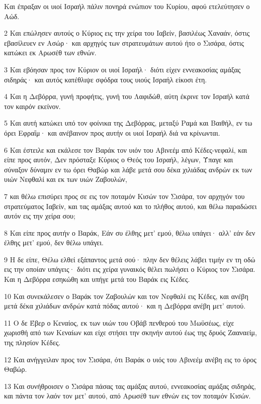\par Και έπραξαν οι υιοί Ισραήλ πάλιν πονηρά ενώπιον του Κυρίου, αφού ετελεύτησεν ο Αώδ.
\par 2 Και επώλησεν αυτούς ο Κύριος εις την χείρα του Ιαβείν, βασιλέως Χαναάν, όστις εβασίλευεν εν Ασώρ· και αρχηγός των στρατευμάτων αυτού ήτο ο Σισάρα, όστις κατώκει εκ Αρωσέθ των εθνών.
\par 3 Και εβόησαν προς τον Κύριον οι υιοί Ισραήλ· διότι είχεν εννεακοσίας αμάξας σιδηράς· και αυτός κατέθλιψε σφόδρα τους υιούς Ισραήλ είκοσι έτη.
\par 4 Και η Δεβόρρα, γυνή προφήτις, γυνή του Λαφιδώθ, αύτη έκρινε τον Ισραήλ κατά τον καιρόν εκείνον.
\par 5 Και αυτή κατώκει υπό τον φοίνικα της Δεβόρρας, μεταξύ Ραμά και Βαιθήλ, εν τω όρει Εφραΐμ· και ανέβαινον προς αυτήν οι υιοί Ισραήλ διά να κρίνωνται.
\par 6 Και έστειλε και εκάλεσε τον Βαράκ τον υιόν του Αβινεέμ από Κέδες-νεφαλί, και είπε προς αυτόν, Δεν πρόσταξε Κύριος ο Θεός του Ισραήλ, λέγων, Ύπαγε και σύναξον δύναμιν εν τω όρει Θαβώρ και λάβε μετά σου δέκα χιλιάδας ανδρών εκ των υιών Νεφθαλί και εκ των υιών Ζαβουλών,
\par 7 και θέλω επισύρει προς σε εις τον ποταμόν Κισών τον Σισάρα, τον αρχηγόν του στρατεύματος Ιαβείν, και τας αμάξας αυτού και το πλήθος αυτού, και θέλω παραδώσει αυτόν εις την χείρα σου;
\par 8 Και είπε προς αυτήν ο Βαράκ, Εάν συ έλθης μετ' εμού, θέλω υπάγει· αλλ' εάν δεν έλθης μετ' εμού, δεν θέλω υπάγει.
\par 9 Η δε είπε, Θέλω ελθεί εξάπαντος μετά σού· πλην δεν θέλεις λάβει τιμήν εν τη οδώ εις την οποίαν υπάγεις· διότι εις χείρα γυναικός θέλει πωλήσει ο Κύριος τον Σισάρα. Και η Δεβόρρα εσηκώθη και υπήγε μετά του Βαράκ εις Κέδες.
\par 10 Και συνεκάλεσεν ο Βαράκ τον Ζαβουλών και τον Νεφθαλί εις Κέδες, και ανέβη μετά δέκα χιλιάδων ανδρών κατά πόδας αυτού· και η Δεβόρρα ανέβη μετ' αυτού.
\par 11 Ο δε Έβερ ο Κεναίος, εκ των υιών του Οβάβ πενθερού του Μωϋσέως, είχε χωρισθή από των Κεναίων και είχε στήσει την σκηνήν αυτού έως της δρυός Ζααναείμ, της πλησίον Κέδες.
\par 12 Και ανήγγειλαν προς τον Σισάρα, ότι Βαράκ ο υιός του Αβινεέμ ανέβη εις το όρος Θαβώρ.
\par 13 Και συνήθροισεν ο Σισάρα πάσας τας αμάξας αυτού, εννεακοσίας αμάξας σιδηράς, και πάντα τον λαόν τον μετ' αυτού, από Αρωσέθ των εθνών εις τον ποταμόν Κισών.
